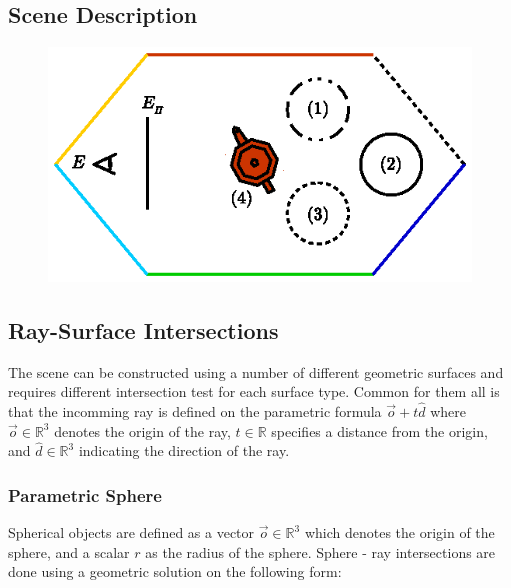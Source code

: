 \documentclass[a4paper, twocolumn]{article}
\begin{document}
        \subsection{Scene Description} \label{sec:scene_description}

        \begin{figure}[ht]
            \centering
            \includegraphics[width=0.8\linewidth]{share/scene_description.eps}
            \caption{}
            \label{fig:scene_description}
        \end{figure}

        \clearpage

        \subsection{Ray-Surface Intersections} \label{sec:ray-surface_intersections}

        The scene can be constructed using a number of different geometric surfaces and requires different intersection test for each surface type. Common for them all is that the incomming ray is defined on the parametric formula \( \vec{o} + t \hat{d} \) where \( \vec{o} \in \mathbb{R}^3\) denotes the origin of the ray, \(t \in \mathbb{R}\) specifies a distance from the origin, and \(\hat{d} \in \mathbb{R}^3\) indicating the direction of the ray.
            
        \subsubsection{Parametric Sphere} \label{sec:parametric_sphere}
        
        Spherical objects are defined as a vector \(\vec{o} \in \mathbb{R}^3\) which denotes the origin of the sphere, and a scalar \(r\) as the radius of the sphere. Sphere - ray intersections are done using a geometric solution on the following form:
\end{document}
